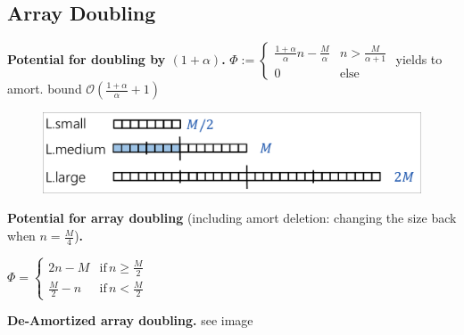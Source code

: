 \documentclass[]{article}
\newcommand\compactsubsection[1]        {\vspace{-10pt}\subsection{#1}\vspace{-6pt}}
\theoremstyle{definition}
\newcommand\oc    {\mathcal{O}}
\newcommand\other {\mathrm{else}}
\newcommand\ag        {\alpha}
\newcommand\cl [1]    {\left ( #1 \right )}
\begin{document}
\begin{multicols}{4}
			\compactsubsection{Array Doubling}
				\textbf{Potential for doubling by $(1 + \ag)$. }$\Phi := \begin{cases}
					\frac{1 + \ag}{\ag} n - \frac{M}{\ag} & \!n > \frac{M}{\ag + 1} \\
					0 & \!\other
				\end{cases}$
				\!\!yields to amort. bound $\oc\cl{\frac{1 + \ag}{\ag} + 1}$ \\
				\begin{figure}
					\includegraphics[width=\linewidth]{images/deAmoritzedArray}
					\vspace{-10pt}
				\end{figure}
				\textbf{Potential for array doubling} (including amort deletion: changing the size back when $n = \frac{M}{4}$)\textbf{. }
				
				\vspace{-5pt}
				\hfil $\Phi = \begin{cases}
					2n - M & \text{if}\, n \ge \frac{M}{2} \\
					\frac{M}{2} - n & \text{if}\, n < \frac{M}{2}
				\end{cases}$
				
				\textbf{De-Amortized array doubling. }see image \\
		
	\end{multicols}
	
\end{document}
